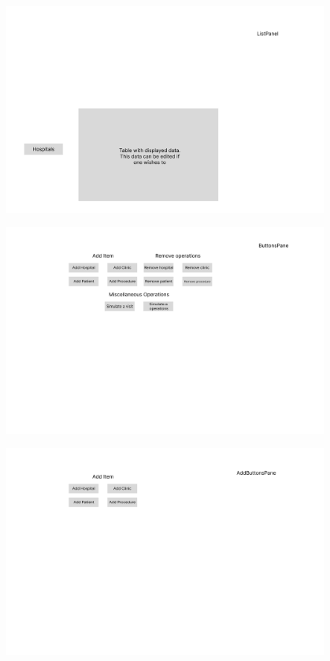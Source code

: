 \documentclass{article}
\begin{document}
\begin{figure}
  \begin{center}
    \includegraphics[width=0.95\textwidth]{./figures/Interface_designs/ListPanel.png}
  \end{center}
\end{figure}

\begin{figure}
  \begin{center}
    \includegraphics[width=0.95\textwidth]{./figures/Interface_designs/ButtonsPanel.png}
  \end{center}
\end{figure}

\begin{figure}
  \begin{center}
    \includegraphics[width=0.95\textwidth]{./figures/Interface_designs/AddButtonsPanel.png}
  \end{center}
\end{figure}
\end{document}

